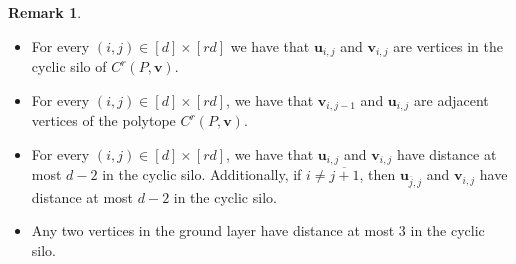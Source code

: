 \documentclass[centering,11pt,reqno]{amsart}
\theoremstyle{definition}
\newtheorem{remark}[theorem]{Remark}
\begin{document}
\begin{remark}\label{rem:record}
\noindent
\begin{itemize}
    \item For every $(i,j)\in [d]\times[rd]$ we have that $\mathbf{u}_{i,j}$ and $\mathbf{v}_{i,j}$ are vertices in the cyclic silo of $C^r(P,\mathbf{v})$. 
    \item For every $(i,j)\in [d]\times [rd]$, we have that $\mathbf{v}_{i,j-1}$ and $\mathbf{u}_{i,j}$ are adjacent vertices of the polytope $C^r(P,\mathbf{v})$.
    \item For every $(i,j)\in [d]\times [rd]$, we have that $\mathbf{u}_{i,j}$ and $\mathbf{v}_{i,j}$ have distance at most $d-2$ in the cyclic silo. Additionally, if $i\neq \overline{j+1}$, then $\mathbf{u}_{\overline{j},j}$ and $\mathbf{v}_{i,j}$ have distance at most $d-2$ in the cyclic silo.
    \item Any two vertices in the ground layer have distance at most $3$ in the cyclic silo.
\end{itemize}
\end{remark}
\end{document}
